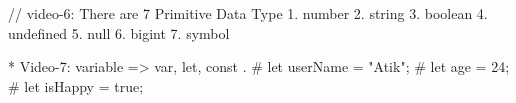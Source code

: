// video-6: There are 7 Primitive Data Type
1. number
2. string
3. boolean
4. undefined
5. null
6. bigint
7. symbol

* Video-7: 
variable => var, let, const .
# let userName = "Atik";
# let age = 24;
# let isHappy = true;